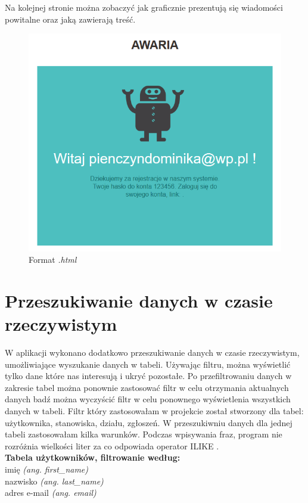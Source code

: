 \documentclass[openright]{xmgr}
\begin{document}
	Na kolejnej stronie można zobaczyć jak graficznie prezentują się wiadomości powitalne oraz jaką zawierają treść. 
	\newpage
	\begin{figure}[!tbh]
		\centering
		\includegraphics[width=\linewidth]{image/e-mail}
		\caption{Format \textit{.html}}
	\end{figure}
	\newpage
	\section{Przeszukiwanie danych w czasie rzeczywistym}
	
	W aplikacji wykonano dodatkowo przeszukiwanie danych w czasie rzeczywistym, umożliwiające wyszukanie danych w tabeli. Używając filtru, można wyświetlić tylko dane które nas interesują i ukryć pozostałe. Po przefiltrowaniu danych w zakresie tabel można ponownie zastosować filtr w celu otrzymania aktualnych danych badź można wyczyścić filtr w celu ponownego wyświetlenia wszystkich danych w tabeli. 
	Filtr który zastosowałam w projekcie został stworzony dla tabel: użytkownika, stanowiska, działu, zgłoszeń. W przeszukiwniu danych dla jednej tabeli zastosowałam kilka warunków. Podczas wpisywania fraz, program nie rozróżnia wielkości liter za co odpowiada operator ILIKE .\\
	
	\textbf{Tabela użytkowników, filtrowanie według:}\\
	\textendash\space imię \textit{(ang. first\_name)}\\
	\textendash\space nazwisko \textit{(ang. last\_name)}\\
	\textendash\space adres e-mail
	\textit{(ang. email)}\\
	
\end{document}
